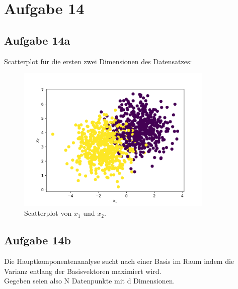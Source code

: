 


  \section{Aufgabe 14}
    \subsection{Aufgabe 14a}
    Scatterplot für die ersten zwei Dimensionen des Datensatzes:
    \begin{figure}[H]
      \centering
      \includegraphics[height=7cm]{a_scatter.pdf}
      \caption{Scatterplot von $x_1$ und $x_2$.}
      \label{fig:ascatter}
    \end{figure}

    \subsection{Aufgabe 14b}
    Die Hauptkomponentenanalyse sucht nach einer Basis im Raum indem die Varianz entlang der Basisvektoren maximiert wird.\\
    Gegeben seien also N
    Datenpunkte mit d Dimensionen.

